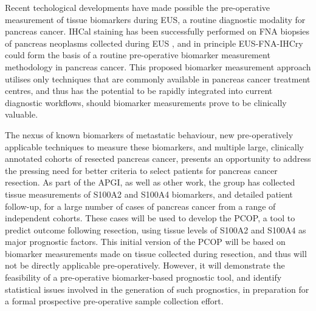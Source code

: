 \documentclass[dissertation.tex]{subfiles}
\begin{document}
Recent techological developments have made possible the pre-operative measurement of tissue biomarkers during \gls{EUS}, a routine diagnostic modality for pancreas cancer.  \Gls{IHCal} staining has been successfully performed on \gls{FNA} biopsies of pancreas neoplasms collected during \gls{EUS} \cite{Popescu2012, Salla2009, Stelow2005}, and in principle \gls{EUS}-\gls{FNA}-\acrshort{IHCry} could form the basis of a routine pre-operative biomarker measurement methodology in pancreas cancer.  This proposed biomarker measurement approach utilises only techniques that are commonly available in pancreas cancer treatment centres, and thus has the potential to be rapidly integrated into current diagnostic workflows, should biomarker measurements prove to be clinically valuable.

The nexus of known biomarkers of metastatic behaviour, new pre-operatively applicable techniques to measure these biomarkers, and multiple large, clinically annotated cohorts of resected pancreas cancer, presents an opportunity to address the pressing need for better criteria to select patients for pancreas cancer resection.  As part of the \gls{APGI}, as well as other work, the group has collected tissue measurements of S100A2 and S100A4 biomarkers, and detailed patient follow-up, for a large number of cases of pancreas cancer from a range of independent cohorts.  These cases will be used to develop the \gls{PCOP}, a tool to predict outcome following resection, using tissue levels of S100A2 and S100A4 as major prognostic factors.  This initial version of the \gls{PCOP} will be based on biomarker measurements made on tissue collected during resection, and thus will not be directly applicable pre-operatively.  However, it will demonstrate the feasibility of a pre-operative biomarker-based prognostic tool, and identify statistical issues involved in the generation of such prognostics, in preparation for a formal prospective pre-operative sample collection effort.
\end{document}
